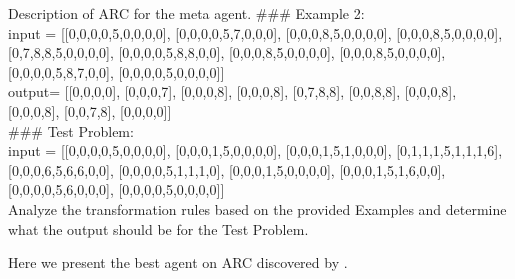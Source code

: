 \begin{mybox}{Description of ARC for the meta agent.}
\#\#\# Example 2:\\
input = [[0,0,0,0,5,0,0,0,0], [0,0,0,0,5,7,0,0,0], [0,0,0,8,5,0,0,0,0], [0,0,0,8,5,0,0,0,0], [0,7,8,8,5,0,0,0,0], [0,0,0,0,5,8,8,0,0], [0,0,0,8,5,0,0,0,0], [0,0,0,8,5,0,0,0,0], [0,0,0,0,5,8,7,0,0], [0,0,0,0,5,0,0,0,0]]\\
output= [[0,0,0,0], [0,0,0,7], [0,0,0,8], [0,0,0,8], [0,7,8,8], [0,0,8,8], [0,0,0,8], [0,0,0,8], [0,0,7,8], [0,0,0,0]]\\

\#\#\# Test Problem:\\
input = [[0,0,0,0,5,0,0,0,0], [0,0,0,1,5,0,0,0,0], [0,0,0,1,5,1,0,0,0], [0,1,1,1,5,1,1,1,6], [0,0,0,6,5,6,6,0,0], [0,0,0,0,5,1,1,1,0], [0,0,0,1,5,0,0,0,0], [0,0,0,1,5,1,6,0,0], [0,0,0,0,5,6,0,0,0], [0,0,0,0,5,0,0,0,0]]\\

Analyze the transformation rules based on the provided Examples and determine what the output should be for the Test Problem.\\
\end{mybox}

Here we present the best agent on ARC discovered by \ouralgo.

